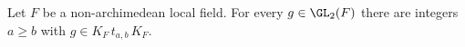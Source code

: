 Let $F$ be a non-archimedean local field. For every $g\in\GL_2(F)$ there are integers $a\ge b$ with
$g\in K_F\,t_{a,b}\,K_F$.
